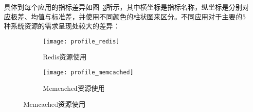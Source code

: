 具体到每个应用的指标差异如图~\ref{fig:resource_affinity_0}所示，其中横坐标是指标名称，纵坐标是分别对应极差、均值与标准差，并使用不同颜色的柱状图来区分。不同应用对于主要的5种系统资源的需求呈现处较大的差异：

\begin{figure}[H]
    \centering
    \begin{subfigure}[b]{0.85\textwidth}
      \texttt{[image: profile\_redis]}
      \caption{Redis资源使用}
      \label{fig:profile_redis}
    \end{subfigure}
    \begin{subfigure}[b]{0.85\textwidth}
        \texttt{[image: profile\_memcached]}
        \caption{Memcached资源使用}
        \label{fig:profile_memcached}
    \end{subfigure}
\label{fig:resource_affinity_0}
\end{figure}

